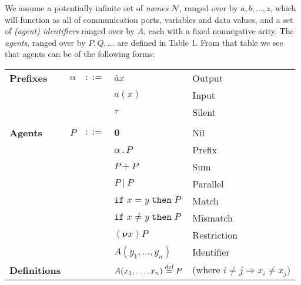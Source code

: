 \documentclass[10pt,a4paper]{article}
\newcommand{\ifthen}[2]{\texttt{if}\;#1\;\texttt{then}\;#2}
\newcommand{\resp}[1]{(\boldsymbol{\nu}#1)}
\newcommand{\res}[2]{\resp{#1}#2}
\newcommand{\nil}{\mathbf{0}}
\newcommand{\outp}[2]{\overline{#1}#2}
\newcommand{\inpp}[2]{#1(#2)}
\newcommand{\silp}{\tau}
\newcommand{\prefix}[2]{{#1}\,.\,#2}
\newcommand{\defi}{\buildrel \text{def}\over =}
\newcommand{\para}{\:|\:}
\begin{document}
We assume a potentially infinite set of \emph{names} $\mathcal{N}$, ranged over by $a, b,\dots, z$, which will function as all of communication ports, variables and data values, and a set of \emph{(agent) identifiers} ranged over by $A$, each with a fixed nonnegative arity. The \emph{agents}, ranged over by $P, Q, \dots$ are defined in Table 1. From that table we see that agents can be of the following forms:

\begin{framed}
  \begin{center}  
	\begin{tabular}{l l l l l}
  	\textbf{Prefixes} & $\alpha$ & $::=$ & $\outp{a}{x}$ & Output \\
  	&&& $\inpp{a}{x}$ & Input \\
  	&&& $\silp$ & Silent \\
	\\
  	\textbf{Agents} & $P$ & $::=$ & $\nil$ & Nil \\
  	&&& $\prefix{\alpha}{P}$ & Prefix \\
  	&&& $P + P$ & Sum \\
  	&&& $P \para P$ & Parallel \\
  	&&& $\ifthen{x = y}{P}$ & Match \\
  	&&& $\ifthen{x \neq y}{P}$ & Mismatch \\
  	&&& $\res{x}{P}$ & Restriction \\
  	&&& $A(y_1,\dots,y_n)$ & Identifier \\
  	\textbf{Definitions} &&& $A(x_1,\dots,x_n) \defi P$ & (where $i \neq j \Rightarrow x_i \neq x_j$) \\
	\end{tabular}
  \end{center}
\end{framed}
\end{document}
